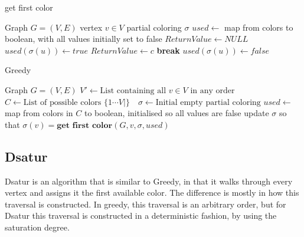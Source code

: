 \documentclass[a4paper]{article}
\newcommand{\algorithmicbreak}{\textbf{break}}
\newcommand{\BREAK}{\STATE \algorithmicbreak}
\begin{document}


\begin{algorithm}[H]
  \caption{get first color}
  \label{alg:greedy}
  \begin{algorithmic}[1]
      \REQUIRE Graph $G = (V,E)$
      \REQUIRE vertex $v \in V$
      \REQUIRE partial coloring $\sigma$
      \REQUIRE $used \leftarrow $ map from colors to boolean, with all values
      initially set to false
        \STATE $ReturnValue \leftarrow NULL$
                \STATE $used(\sigma(u)) \leftarrow true$
            \ENDIF
        \ENDFOR
                \STATE $ReturnValue \leftarrow c$
                \BREAK
            \ENDIF
        \ENDFOR
                \STATE $used(\sigma(u)) \leftarrow false$
            \ENDIF
        \ENDFOR
  \end{algorithmic}
\end{algorithm}


\begin{algorithm}[H]
  \caption{Greedy}
  \label{alg:greedy}
  \begin{algorithmic}[1]
      \REQUIRE Graph $G = (V,E)$
      \STATE $V' \leftarrow \text{List containing all $v \in V$ in any order}$
      \STATE $C \leftarrow \text{List of possible colors $\{1 \cdots V| \}$ }$
      \STATE $\sigma \leftarrow \text{Initial empty partial coloring}$
      \STATE $used \leftarrow $ map from colors in $C$ to boolean, initialised
      so all values are false
        \STATE update $\sigma$ so that  $\sigma(v) = \textbf{get first color}(G,v,\sigma,used)$
    \ENDFOR
  \end{algorithmic}
\end{algorithm}

\subsection{Dsatur}

Dsatur is an algorithm that is similar to Greedy, in that it walks through every
vertex and assigns it the first available color. The difference is mostly in
how this traversal is constructed. In greedy, this traversal is an arbitrary
order, but for Dsatur this traversal is constructed in a deterministic fashion,
by using the saturation degree.
\end{document}
